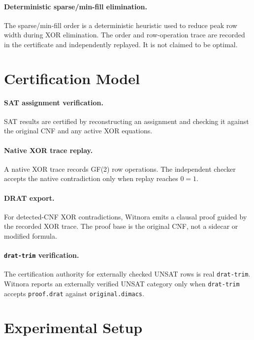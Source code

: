 \documentclass[10pt]{article}
\begin{document}
\paragraph{Deterministic sparse/min-fill elimination.}
The sparse/min-fill order is a deterministic heuristic used to reduce peak row
width during XOR elimination. The order and row-operation trace are recorded in
the certificate and independently replayed. It is not claimed to be optimal.

\section{Certification Model}

\paragraph{SAT assignment verification.}
SAT results are certified by reconstructing an assignment and checking it
against the original CNF and any active XOR equations.

\paragraph{Native XOR trace replay.}
A native XOR trace records GF(2) row operations. The independent checker
accepts the native contradiction only when replay reaches \(0 = 1\).

\paragraph{DRAT export.}
For detected-CNF XOR contradictions, Witnora emits a clausal proof guided by
the recorded XOR trace. The proof base is the original CNF, not a sidecar or
modified formula.

\paragraph{\texttt{drat-trim} verification.}
The certification authority for externally checked UNSAT rows is real
\texttt{drat-trim}. Witnora reports an externally verified UNSAT category only
when \texttt{drat-trim} accepts \texttt{proof.drat} against
\texttt{original.dimacs}.

\section{Experimental Setup}
\end{document}
